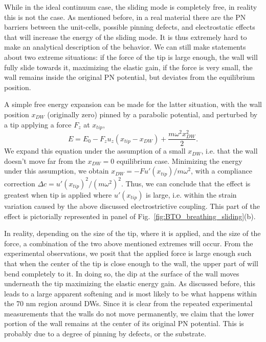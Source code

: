 While in the ideal continuum case, the sliding mode is completely free, in reality this is not the case.
As mentioned before, in a real material there are the PN barriers between the unit-cells, possible pinning defects, and electrostatic effects that will increase the energy of the sliding mode.
It is thus extremely hard to make an analytical description of the behavior.
We can still make statements about two extreme situations: if the force of the tip is large enough, the wall will fully slide towards it, maximizing the elastic gain, if the force is very small, the wall remains inside the original PN potential, but deviates from the equilibrium position.

A simple free energy expansion can be made for the latter situation, with the wall position $x_{DW}$ (originally zero) pinned by a parabolic potential, and perturbed by a tip applying a force $F_z$ at $x_{tip}$,
\begin{equation}
	E = E_0 - F_z u_z (x_{tip} - x_{DW}) + \frac{m\omega^2 x_{DW}^2}{2}.
\end{equation}
We expand this equation under the assumption of a small $x_{DW}$, i.e. that the wall doesn't move far from the $x_{DW}=0$ equilibrium case.
Minimizing the energy under this assumption, we obtain $x_{DW} = -F u'(x_{tip})/m \omega^2$, with a compliance correction $\Delta c = u'(x_{tip})^2/(m\omega^2)^2$.
Thus, we can conclude that the effect is greatest when tip is applied where $u'(x_{tip})$ is large, i.e. within the strain variation caused by the above discussed electrostrictive coupling.
This part of the effect is pictorially represented in panel of Fig.~\ref{fig:BTO_breathing_sliding}(b).


In reality, depending on the size of the tip, where it is applied, and the size of the force, a combination of the two above mentioned extremes will occur.
From the experimental observations, we posit that the applied force is large enough such that when the center of the tip is close enough to the wall, the upper part of will bend completely to it.
In doing so, the dip at the surface of the wall moves underneath the tip maximizing the elastic energy gain.
As discussed before, this leads to a large apparent softening and is most likely to be what happens within the 70 nm region around DWs.
Since it is clear from the repeated experimental measurements that the walls do not move permanently, we claim that the lower portion of the wall remains at the center of its original PN potential.
This is probably due to a degree of pinning by defects, or the substrate.

